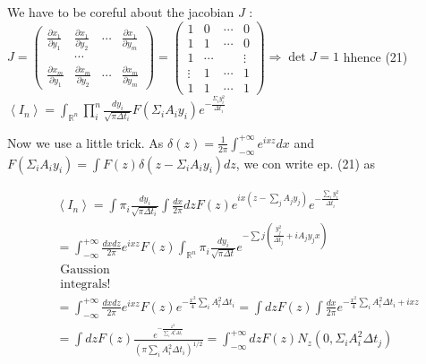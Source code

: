 We have to be coreful about the jacobian $J$ :\n$J=\left(\begin{array}{cccc}\frac{\partial x_{1}}{\partial y_{1}} & \frac{\partial x_{1}}{\partial y_{2}} & \cdots & \frac{\partial x_{1}}{\partial y_{m}} \\ & \cdots & & \\ \frac{\partial x_{m}}{\partial y_{1}} & \frac{\partial x_{m}}{\partial y_{2}} & \cdots & \frac{\partial x_{m}}{\partial y_{m}}\end{array}\right)=\left(\begin{array}{cccc}1 & 0 & \cdots & 0 \\ 1 & 1 & \cdots & 0 \\ 1 & \cdots & & \vdots \\ \vdots & 1 & \cdots & 1 \\ 1 & 1 & \cdots & 1\end{array}\right) \Rightarrow \operatorname{det} J=1$
hhence
(21) $\left\langle I_{n}\right\rangle=\int_{\mathbb{R}^{n}} \prod_{i}^{n} \frac{d y_{i}}{\sqrt{\pi \Delta t_{i}}} F\left(\Sigma_{i} A_{i} y_{i}\right) e^{-\frac{\Sigma_{i} y_{i}^{2}}{\Delta t_{i}}}$

Now we use a little trick. As $\delta(z)=\frac{1}{2 \pi} \int_{-\infty}^{+\infty} e^{i x z} d x$ and $F\left(\Sigma_{i} A_{i} y_{i}\right)=\int F(z) \delta\left(z-\Sigma_{i} A_{i} y_{i}\right) d z$, we con write ep. (21) as

$$ 
\begin{aligned}
& \left\langle I_{n}\right\rangle=\int \pi_{i} \frac{d y_{i}}{\sqrt{\pi \Delta t_{i}}} \int \frac{d x}{2 \pi} d z F(z) e^{i x\left(z-\sum_{j} A_{j} y_{j}\right)} e^{-\frac{\sum_{i} y_{i}^{2}}{\Delta t_{i}}} \\ 
& =\int_{-\infty}^{+\infty} \frac{d x d z}{2 \pi} e^{i x z} F(z) \int_{\mathbb{R}^{n}} \pi_{i} \frac{d y_{i}}{\sqrt{\pi \Delta t}} e^{-\sum j\left(\frac{y_{j}^{2}}{\Delta t_{j}}+i A_{j} y_{j} x\right)} \\ 
& \text { Gaussion } \\
& \text { integrals! } \\
& =\int_{-\infty}^{+\infty} \frac{d x d z}{2 \pi} e^{i x z} F(z) e^{-\frac{x^{2}}{4} \sum_{i} A_{i}^{2} \Delta t_{i}}=\int d z F(z) \int \frac{d x}{2 \pi} e^{-\frac{x^{2}}{4} \sum_{i} A_{i}^{2} \Delta t_{i}+i x z} \\ 
& =\int d z F(z) \frac{e^{-\frac{z^{2}}{\sum_{i} A_{i}^{2} \Delta t_{i}}}}{\left(\pi \sum_{i} A_{i}^{2} \Delta t_{i}\right)^{1 / 2}}=\int_{-\infty}^{+\infty} d z F(z) N_{z}\left(0, \Sigma_{i} A_{i}^{2} \Delta t_{j}\right)
\end{aligned}
$$ 

